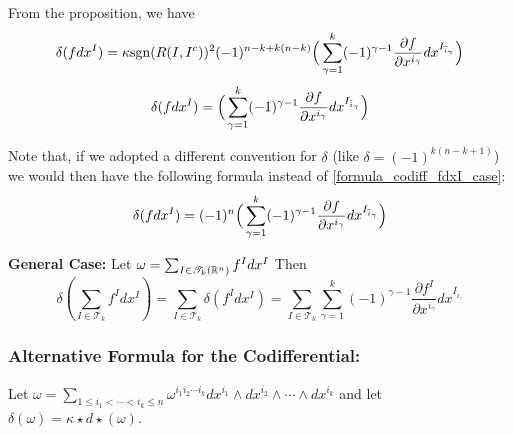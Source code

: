 From the proposition, we have $$\delta(fdx^I)=\kappa \mathrm{sgn}(R(I,I^c))^2(-1)^{n-k+k(n-k)}\Big{(}\sum_{\gamma=1}^k (-1)^{\gamma-1}\frac{\partial f}{\partial x^{i_{\gamma}}}dx^{I_{\widehat i_{\gamma}}} \Big{)}$$ 
\begin{equation}\label{formula_codiff_fdxI_case}\delta(fdx^I)=\Big{(}\sum_{\gamma=1}^k (-1)^{\gamma-1}\frac{\partial f}{\partial x^{i_{\gamma}}}dx^{I_{\widehat i_{\gamma}}} \Big{)} \end{equation}
\begin{remark}
    Note that, if we adopted a different convention for $\delta$ (like $\delta=(-1)^{k(n-k+1)}$) we would then have the following formula instead of \eqref{formula_codiff_fdxI_case}:
    \begin{equation}\delta(fdx^I)=(-1)^n\Big{(}\sum_{\gamma=1}^k (-1)^{\gamma-1}\frac{\partial f}{\partial x^{i_{\gamma}}}dx^{I_{\widehat i_{\gamma}}} \Big{)} \end{equation}
\end{remark}
\noindent\textbf{General Case:}
Let $\omega=\sum_{I\in \mathscr T_k(\mathbb{R}^n)} f^I dx^I $
Then \begin{equation}\label{codiff_expansion_formula_general_kform}
    \delta(\sum_{I\in \mathscr T_k}f^I dx^I)=\sum_{I\in \mathscr T_k} \delta(f^I dx^I)=\sum_{I\in \mathscr T_k}\sum_{\gamma=1}^k (-1)^{\gamma-1}\frac{\partial f^I}{\partial x^{i_{\gamma}}} dx^{I_{\widehat i_{\gamma}}} 
\end{equation}

\subsubsection{Alternative Formula for the Codifferential:}
Let $\omega=\sum_{1\leq i_1<\cdots<i_k\leq n} \omega^{i_1i_2\cdots i_k}dx^{i_1}\wedge dx^{i_2}\wedge \cdots \wedge dx^{i_k}$ and let $\delta(\omega)=\kappa \star d \star (\omega)$.

